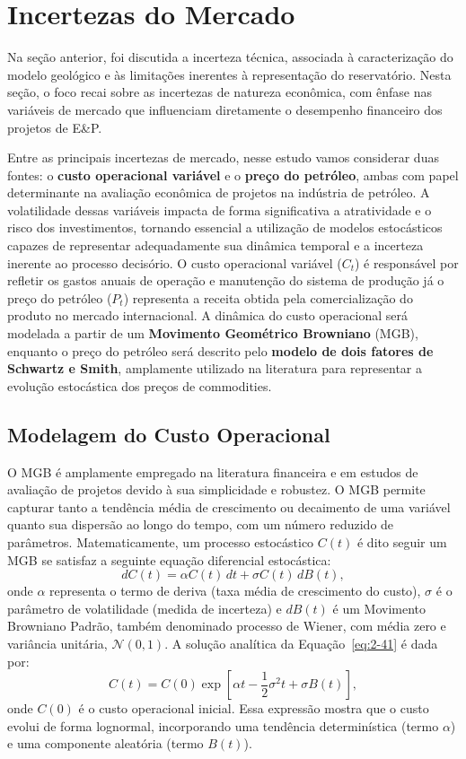 \section{Incertezas do Mercado}

Na seção anterior, foi discutida a incerteza técnica, associada à caracterização do modelo geológico e às limitações inerentes à representação do reservatório. Nesta seção, o foco recai sobre as incertezas de natureza econômica, com ênfase nas variáveis de mercado que influenciam diretamente o desempenho financeiro dos projetos de E\&P.

Entre as principais incertezas de mercado, nesse estudo vamos considerar duas fontes: o \textbf{custo operacional variável} e o \textbf{preço do petróleo}, ambas com papel determinante na avaliação econômica de projetos na indústria de petróleo. A volatilidade dessas variáveis impacta de forma significativa a atratividade e o risco dos investimentos, tornando essencial a utilização de modelos estocásticos capazes de representar adequadamente sua dinâmica temporal e a incerteza inerente ao processo decisório. O custo operacional variável ($C_t$) é responsável por refletir os gastos anuais de operação e manutenção do sistema de produção já o preço do petróleo ($P_t$) representa a receita obtida pela comercialização do produto no mercado internacional. A dinâmica do custo operacional será modelada a partir de um \textbf{Movimento Geométrico Browniano} (MGB), enquanto o preço do petróleo será descrito pelo \textbf{modelo de dois fatores de Schwartz e Smith}, amplamente utilizado na literatura para representar a evolução estocástica dos preços de commodities.

\subsection{Modelagem do Custo Operacional}

O MGB é amplamente empregado na literatura financeira e em estudos de avaliação de projetos devido à sua simplicidade e robustez. O MGB permite capturar tanto a tendência média de crescimento ou decaimento de uma variável quanto sua dispersão ao longo do tempo, com um número reduzido de parâmetros. Matematicamente, um processo estocástico $C(t)$ é dito seguir um MGB se satisfaz a seguinte equação diferencial estocástica:
\begin{equation}
dC(t) = \alpha C(t)\,dt + \sigma C(t)\,dB(t),
\label{eq:2-41}
\end{equation}
onde $\alpha$ representa o termo de deriva (taxa média de crescimento do custo), $\sigma$ é o parâmetro de volatilidade (medida de incerteza) e $dB(t)$ é um Movimento Browniano Padrão, também denominado processo de Wiener, com média zero e variância unitária, $\mathcal{N}(0, 1)$. A solução analítica da Equação~\ref{eq:2-41} é dada por:
\begin{equation}
C(t) = C(0)\exp\left[\alpha t - \frac{1}{2}\sigma^2 t + \sigma B(t)\right],
\label{eq:2-42}
\end{equation}
onde $C(0)$ é o custo operacional inicial. Essa expressão mostra que o custo evolui de forma lognormal, incorporando uma tendência determinística (termo $\alpha$) e uma componente aleatória (termo $B(t)$).

